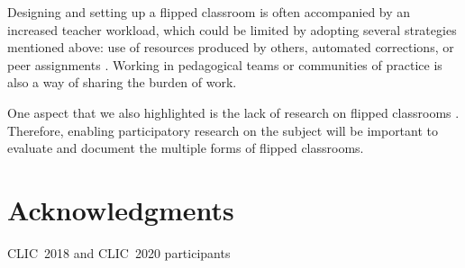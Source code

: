 \documentclass[10pt,letterpaper]{article}
\begin{document}
Designing and setting up a flipped classroom is often accompanied by an increased teacher workload, which 
could be limited by adopting several strategies mentioned above: use of resources produced by others,
automated corrections, or peer assignments \cite{guilbault_classe_2017}. Working in pedagogical teams or communities of practice is also a way of sharing the burden of work.

One aspect that we also highlighted is the lack of research on flipped classrooms \cite{hew_does_2020}. 
Therefore, enabling participatory research on the subject will be important to evaluate 
and document the multiple forms of flipped classrooms.


\section*{Acknowledgments}
{CLIC~2018 and CLIC~2020 participants}

\nolinenumbers

%
%
% 


\end{document}
